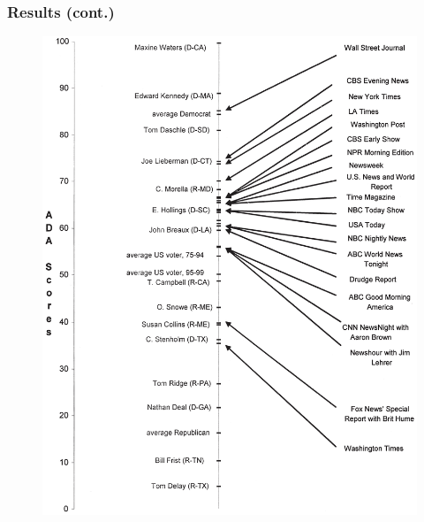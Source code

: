 \documentclass[english]{beamer}
\begin{document}
\begin{frame}
\frametitle{Results (cont.)}

\begin{figure}
\begin{center}
\includegraphics [width=0.7\vsize]{Images/groseclose_milyio_figure_2.png}
\end{center}
\end{figure}
\end{frame}
\end{document}

